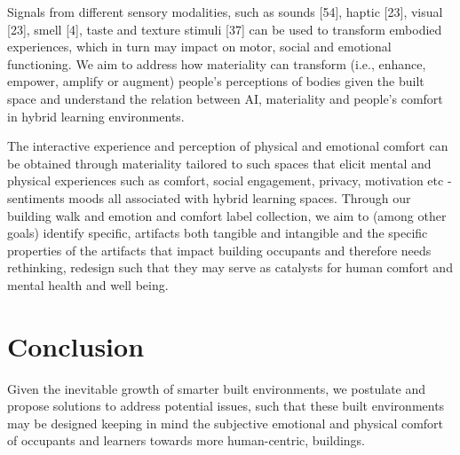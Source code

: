 \documentclass[acmconf, anonymous, review]{acmart}
\begin{document}
Signals from different sensory modalities, such as sounds [54], haptic [23], visual [23], smell [4], taste
and texture stimuli [37] can be used to transform embodied experiences, which in turn may impact on motor, social and
emotional functioning. We aim to address how materiality can transform (i.e., enhance, empower, amplify or augment) people’s perceptions of bodies given the built space and understand the relation between AI, materiality and people’s comfort in hybrid learning environments. 

The interactive experience and perception of physical and emotional comfort can be obtained through materiality tailored to such spaces that elicit mental and physical experiences such as comfort, social engagement, privacy, motivation etc - sentiments moods all associated with hybrid learning spaces.  Through our building walk and emotion and comfort label collection, we aim to (among other goals) identify specific, artifacts both tangible and intangible and the specific properties of the artifacts that impact building occupants and therefore needs rethinking, redesign such that they may serve as catalysts for human comfort and mental health and well being. 





\section{Conclusion}
Given the inevitable growth of smarter built environments, we postulate and propose solutions to address potential issues, such that these built environments may be designed keeping in mind the subjective emotional and physical comfort of occupants and learners towards more human-centric, buildings. 

\todototoc
{}






\end{document}
